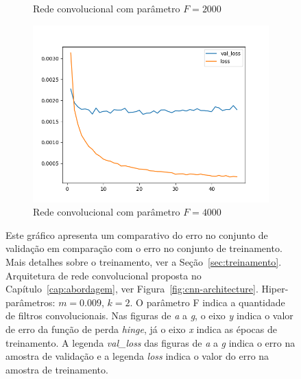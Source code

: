 \begin{figure}[p]
\begin{subfigure}{.5\textwidth}
  \caption{Rede convolucional com parâmetro $F = 2000$}
  \label{fig:cnn-2000-k-2}
\end{subfigure}
\begin{subfigure}{.5\textwidth}
  \centering
  \includegraphics[width=.8\linewidth]{figuras/ape-ajustes-hiper-parametros/cnn-4000-k-2.png}
  \caption{Rede convolucional com parâmetro $F = 4000$}
  \label{fig:cnn-4000-k-2}
\end{subfigure}
\caption{Este gráfico apresenta um comparativo do erro no conjunto de validação em comparação com o erro no conjunto de treinamento. Mais detalhes sobre o treinamento, ver a Seção~\ref{sec:treinamento}. Arquitetura de rede convolucional proposta no Capítulo~\ref{cap:abordagem}, ver Figura~\ref{fig:cnn-architecture}. Hiper-parâmetros: $m = 0.009$, $k = 2$. O parâmetro F indica a quantidade de filtros convolucionais. Nas figuras de \emph{a} a \emph{g}, o eixo \emph{y} indica o valor de erro da função de perda \textit{hinge}, já o eixo \emph{x} indica as épocas de treinamento. A legenda \emph{val\_loss} das figuras de \emph{a} a \emph{g} indica o erro na amostra de validação e a legenda \emph{loss} indica o valor do erro na amostra de treinamento. }
\label{fig:treinamento-cnn-k-2-m-0009}
\end{figure}


